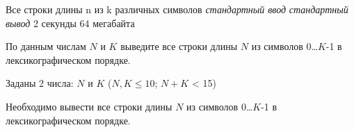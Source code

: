 \begin{problem}%
{Все строки длины n из k различных символов}%
{\textsl{стандартный ввод}}%
{\textsl{стандартный вывод}}%
{2 секунды}%
{64 мегабайта}{}

По данным числам $N$ и $K$ выведите все строки длины $N$ из символов 0\dots$K$-1 в лексикографическом порядке.

\InputFile

Заданы 2 числа: $N$ и $K$ ($N, K \le 10$; $N+K$ < 15)

\OutputFile


Необходимо вывести все строки длины $N$ из символов 0\dots$K$-1 в лексикографическом порядке.

\Examples

\begin{example}
%
\end{example}
\end{problem}